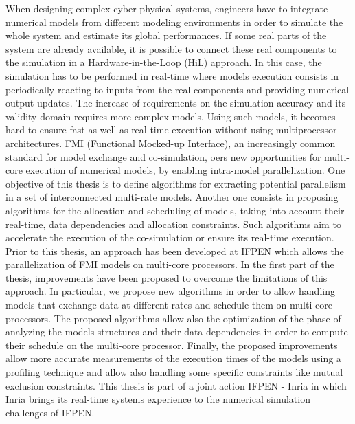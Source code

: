 When designing complex cyber-physical systems, engineers have to integrate numerical models
from different
modeling environments in order to simulate the whole system and estimate its global
performances. If some real parts of the system are already available, it is possible to connect these
real components to the simulation in a Hardware-in-the-Loop (HiL) approach. In this case, the
simulation has to be performed in real-time where models execution consists in periodically
reacting to inputs from the real components and providing numerical output updates. The
increase of requirements on the simulation accuracy and its validity domain requires more
complex models. Using such models, it becomes hard to ensure fast as well as real-time execution without using
multiprocessor architectures. FMI (Functional Mocked-up Interface), an increasingly common
standard for model exchange and co-simulation, oers
new opportunities for multi-core execution
of numerical models, by enabling intra-model parallelization. One objective of this thesis is to
define algorithms for extracting potential parallelism in a set of interconnected multi-rate models.
Another one consists in proposing algorithms for the allocation and scheduling of models, taking %
into account their real-time, data dependencies and allocation constraints. Such algorithms aim to accelerate the execution of the co-simulation or ensure its real-time execution. Prior to this thesis,
an approach has been developed at IFPEN which allows the parallelization of FMI models on
multi-core processors. In the first part of the thesis, improvements have been proposed to overcome
the limitations of this approach. In particular, we propose new algorithms in order to allow
handling models that exchange data at different
rates and schedule them on multi-core processors.
The proposed algorithms allow also the optimization of the phase of analyzing the models structures and
their data dependencies in order to compute their schedule on the multi-core processor. Finally, the
proposed improvements allow more accurate measurements of the execution times of the models using a profiling technique and allow also handling some specific constraints like mutual exclusion constraints. This thesis is part of a joint action IFPEN - Inria in which Inria brings its
real-time systems experience to the numerical simulation challenges of IFPEN.